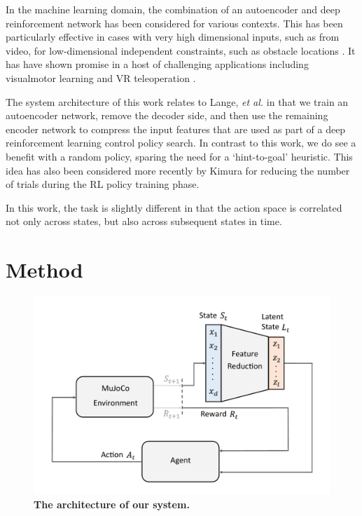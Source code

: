 \documentclass[letterpaper, 10 pt, conference]{ieeeconf}
\begin{document}
In the machine learning domain, the combination of an autoencoder and deep reinforcement network has been considered for various contexts. 
This has been particularly effective in cases with very high dimensional inputs, such as from video, for low-dimensional independent constraints, such as obstacle locations \cite{finn2016deep, bitzer2010using, lynch2019learning}.  
It has have shown promise in a host of challenging applications including visualmotor learning \cite{finn2016deep} and VR teleoperation \cite{zhang2018deep}. 

The system architecture of this work relates to Lange, \emph{et al.} \cite{lange2010deep} in that we train an autoencoder network, remove the decoder side, and then use the remaining encoder network to compress the input features that are used as part of a deep reinforcement learning control policy search.  In contrast to this work, we do see a benefit with a random policy, sparing the need for a `hint-to-goal' heuristic.  This idea has also been considered more recently by Kimura \cite{kimura2018daqn} for reducing the number of trials during the RL policy training phase.  

In this work, the task is slightly different in that the action space is correlated not only across states, but also across subsequent states in time.  

\section{Method}

\begin{figure}[t]
    \centering
    \includegraphics[width=\linewidth]{fig-system-arch}
    \caption{
        \textbf{The architecture of our system.}
    }
    \label{fig:system-arch}
\end{figure}
\end{document}
